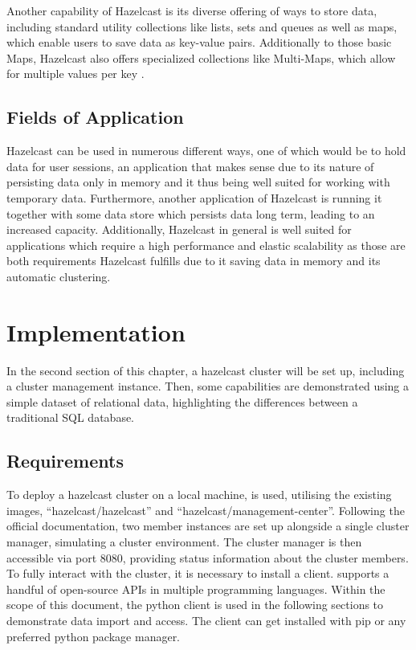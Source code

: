 Another capability of Hazelcast is its diverse offering of ways to store data, including standard utility collections like lists, sets and queues as well as maps, which enable users to save data as key-value pairs. Additionally to those basic Maps, Hazelcast also offers  
specialized collections like Multi-Maps, which allow for multiple values per key \parencite{Johns.2015}.
\subsection{Fields of Application} \label{subsec:fieldsOfApplicationHazelcast}

Hazelcast can be used in numerous different ways, one of which would be to hold data for user sessions, an application that makes sense due to its nature 
of persisting data only in memory and it thus being well suited for working with temporary data. Furthermore, another application of Hazelcast is 
running it together with some data store which persists data long term, leading to an increased capacity. Additionally, Hazelcast in general is well 
suited for applications which require a high performance and elastic scalability as those are both requirements Hazelcast fulfills due to it saving data in memory and 
its automatic clustering\parencite{Johns.2015}. \newline


\section{Implementation} \label{sec:implementationHazelcast}

In the {\color{red}second} section of this chapter, a hazelcast cluster will be set up, including a cluster management 
instance. Then, some capabilities are demonstrated using a simple dataset of relational data, highlighting 
the differences between a traditional SQL database.

\subsection{Requirements} \label{subsec:requirementsHazelcast}

To deploy a hazelcast cluster on a local machine, \textcite{Hazelcast.Docker.Hazelcast, Hazelcast.Docker.ManagementCenter} is used, utilising the existing images, 
\enquote{hazelcast/hazelcast}  and \enquote{hazelcast/management-center}. 
Following the official documentation, two member instances are set up alongside a single cluster manager, 
simulating a cluster environment. The cluster manager is then accessible via port 8080, providing status 
information about the cluster members. To fully interact with the cluster, it is necessary to install a 
client. \textcite{Hazelcast.Clients} supports a handful of open-source APIs in multiple programming languages. 
Within the scope of this document, the python client is 
used in the following sections to demonstrate data import and access. The client can get installed with pip 
or any preferred python package manager.

